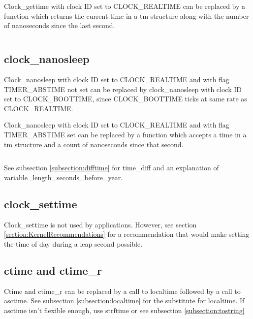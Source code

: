 \documentclass[letterpaper,twoside]{article}
\begin{document}
Clock\_gettime with clock ID set to CLOCK\_REAL\-TIME can be replaced by
a function which returns the current time in a {\ttfamily tm} structure along
with the number of nanoseconds since the last second.
\inputminted[firstline=34]{c}{time_current_tm_nano.c}

\subsection{clock\_nanosleep}
Clock\_nanosleep with clock ID set to CLOCK\_REAL\-TIME and with flag
TIMER\_ABS\-TIME not set can be replaced by clock\_nanosleep with
clock ID set to CLOCK\_BOOTTIME, since CLOCK\_BOOTTIME ticks at
same rate as CLOCK\_REAL\-TIME.

Clock\_nanosleep with clock ID set to CLOCK\_REAL\-TIME and with flag
TIMER\_ABS\-TIME set can be replaced by a function which accepts
a time in a {\ttfamily tm} structure and a count of nanoseconds
since that second.
\inputminted[firstline=32]{c}{time_sleep_until.c}
See subsection \ref{subsection:difftime} for time\_diff
and an explanation of variable\_length\_sec\-onds\_before\_year.

\subsection{clock\_settime}
Clock\_settime is not used by applications.
However, see section \ref{section:KernelRecommendations} for a
recommendation that would make setting the time of day during a
leap second possible.

\subsection{ctime and ctime\_r}
Ctime and ctime\_r can be replaced by a call to localtime followed by
a call to asctime.  See subsection \ref{subsection:localtime}
for the substitute for localtime.
If asctime isn't flexible enough, use strftime or see subsection
\ref{subsection:tostring}
\end{document}
